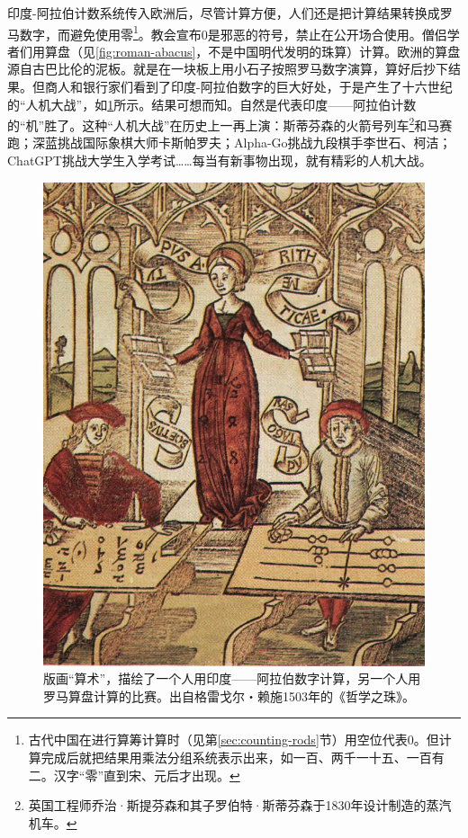 \documentclass[b5paper]{ctexart}
\begin{document}
印度-阿拉伯计数系统传入欧洲后，尽管计算方便，人们还是把计算结果转换成罗马数字，而避免使用零\footnote{古代中国在进行算筹计算时（见第\ref{sec:counting-rods}节）用空位代表0。但计算完成后就把结果用乘法分组系统表示出来，如一百、两千一十五、一百有二。汉字“零”直到宋、元后才出现。}。教会宣布0是邪恶的符号，禁止在公开场合使用。僧侣学者们用算盘（见\cref{fig:roman-abacus}，不是中国明代发明的珠算）计算。欧洲的算盘源自古巴比伦的泥板。就是在一块板上用小石子按照罗马数字演算，算好后抄下结果。但商人和银行家们看到了印度-阿拉伯数字的巨大好处，于是产生了十六世纪的“人机大战”，如\cref{fig:hindu-arabic-vs-abacus}所示。结果可想而知。自然是代表印度——阿拉伯计数的“机”胜了。这种“人机大战”在历史上一再上演：斯蒂芬森的火箭号列车\footnote{英国工程师乔治·斯提芬森和其子罗伯特·斯蒂芬森于1830年设计制造的蒸汽机车。}和马赛跑；深蓝挑战国际象棋大师卡斯帕罗夫；Alpha-Go挑战九段棋手李世石、柯洁；ChatGPT挑战大学生入学考试……每当有新事物出现，就有精彩的人机大战。

\begin{figure}[htbp]
 \centering
 \includegraphics[scale=0.8]{img/Hindu-arabic-vs-abacus}
 \caption{版画“算术”，描绘了一个人用印度——阿拉伯数字计算，另一个人用罗马算盘计算的比赛。出自格雷戈尔・赖施1503年的《哲学之珠》。}
 \label{fig:hindu-arabic-vs-abacus}
\end{figure}
\end{document}
